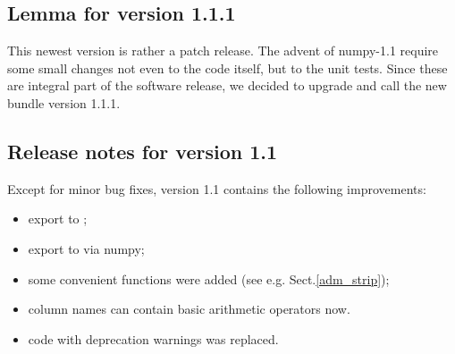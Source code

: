 \subsection{Lemma for version 1.1.1}
This newest version is rather a patch release. The advent of numpy-1.1 require
some small changes not even to the code itself, but to the unit tests. Since these
are integral part of the software release, we decided to upgrade and call the new bundle
version 1.1.1.

\subsection{Release notes for version 1.1}
Except for minor bug fixes, version 1.1 contains the following improvements:
\begin{itemize}
  \item export to
  ;
  \item export to
   via numpy;
  \item some convenient functions were added (see e.g. Sect.\ref{adm_strip});
  \item column names can contain basic arithmetic operators now.
  \item code with deprecation warnings was replaced.
\end{itemize}

